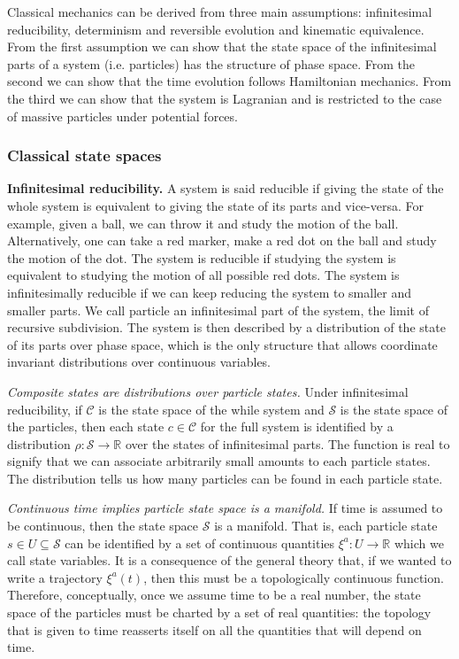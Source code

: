 \documentclass[twocolumn]{article}
\begin{document}
Classical mechanics can be derived from three main assumptions: infinitesimal reducibility, determinism and reversible evolution and kinematic equivalence. From the first assumption we can show that the state space of the infinitesimal parts of a system (i.e. particles) has the structure of phase space. From the second we can show that the time evolution follows Hamiltonian mechanics. From the third we can show that the system is Lagranian and is restricted to the case of massive particles under potential forces.

\subsubsection{Classical state spaces}

\textbf{Infinitesimal reducibility.} A system is said reducible if giving the state of the whole system is equivalent to giving the state of its parts and vice-versa. For example, given a ball, we can throw it and study the motion of the ball. Alternatively, one can take a red marker, make a red dot on the ball and study the motion of the dot. The system is reducible if studying the system is equivalent to studying the motion of all possible red dots. The system is infinitesimally reducible if we can keep reducing the system to smaller and smaller parts. We call particle an infinitesimal part of the system, the limit of recursive subdivision. The system is then described by a distribution of the state of its parts over phase space, which is the only structure that allows coordinate invariant distributions over continuous variables.

\emph{Composite states are distributions over particle states.} Under infinitesimal reducibility, if $\mathcal{C}$ is the state space of the while system and $\mathcal{S}$ is the state space of the particles, then each state $c \in \mathcal{C}$ for the full system is identified by a distribution $\rho : \mathcal{S} \to \mathbb{R}$ over the states of infinitesimal parts. The function is real to signify that we can associate arbitrarily small amounts to each particle states. The distribution tells us how many particles can be found in each particle state.

\emph{Continuous time implies particle state space is a manifold.} If time is assumed to be continuous, then the state space $\mathcal{S}$ is a manifold. That is, each particle state $s \in U \subseteq \mathcal{S}$ can be identified by a set of continuous quantities $\xi^a : U \to \mathbb{R}$ which we call state variables. It is a consequence of the general theory that, if we wanted to write a trajectory $\xi^a(t)$, then this must be a topologically continuous function. Therefore, conceptually, once we assume time to be a real number, the state space of the particles must be charted by a set of real quantities: the topology that is given to time reasserts itself on all the quantities that will depend on time.
\end{document}
